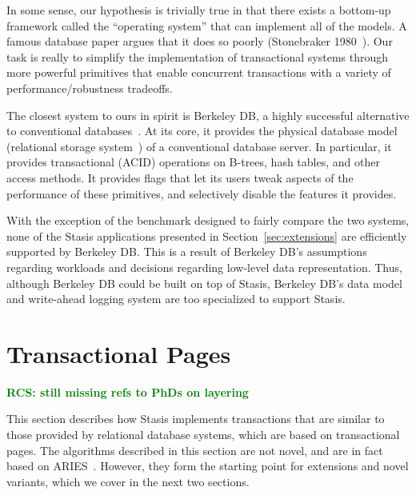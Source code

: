\documentclass[letterpaper,twocolumn,10pt]{article}
\newcommand{\yad}{Stasis\xspace}
\newcommand{\rcs}[1]{\textcolor{green}{\bf RCS: #1}}
\begin{document}
In some sense, our hypothesis is trivially true in that there exists a
bottom-up framework called the ``operating system'' that can implement
all of the models. A famous database paper argues that it does so
poorly (Stonebraker 1980~\cite{Stonebraker80}). Our task is really to
simplify the implementation of transactional systems through more
powerful primitives that enable concurrent transactions with a variety
of performance/robustness tradeoffs.

The closest system to ours in spirit is Berkeley DB,  a highly successful alternative to conventional
databases~\cite{libtp}.  At its core, it provides the physical database model
(relational storage system~\cite{systemR}) of a conventional database server.
In particular, 
it provides transactional (ACID) operations on B-trees, 
hash tables, and other access methods.  It provides flags that 
let its users tweak aspects of the performance of these
primitives, and selectively disable the features it provides.

With the exception of the benchmark designed to fairly compare the two
systems, none of the \yad applications presented in
Section~\ref{sec:extensions} are efficiently supported by Berkeley DB.
This is a result of Berkeley DB's assumptions regarding workloads and
decisions regarding low-level data representation.  Thus, although
Berkeley DB could be built on top of \yad, Berkeley DB's data model
and write-ahead logging system are too specialized to support \yad.




\section{Transactional Pages}

\rcs{still missing refs to PhDs on layering}

This section describes how \yad implements transactions that are
similar to those provided by relational database systems, which are
based on transactional pages.  The algorithms described in this
section are not novel, and are in fact based on
ARIES~\cite{aries}.  However, they form the starting point for
extensions and novel variants, which we cover in the next two
sections.
\end{document}
